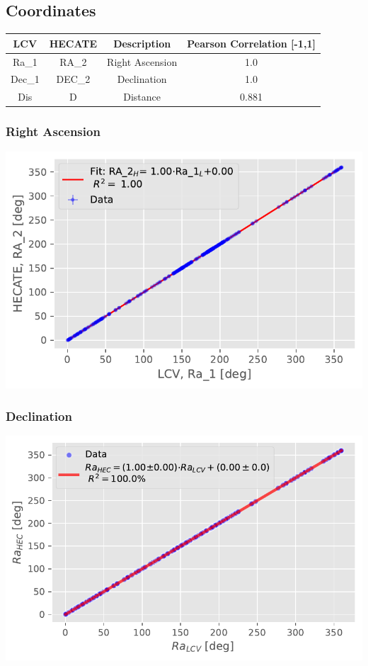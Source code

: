 \documentclass[
]{article}
\begin{document}
\subsection{Coordinates}\label{coordinates}

\begin{longtable}[]{@{}cccc@{}}
\toprule\noalign{}
LCV & HECATE & Description & Pearson Correlation {[}-1,1{]} \\
\midrule\noalign{}
\endhead
\bottomrule\noalign{}
\endlastfoot
Ra\_1 & RA\_2 & Right Ascension & 1.0 \\
Dec\_1 & DEC\_2 & Declination & 1.0 \\
Dis & D & Distance & 0.881 \\
\end{longtable}

\subsubsection{Right Ascension}

\includegraphics{compare_files/figure-pdf/cell-12-output-1.pdf}

\subsubsection{Declination}

\includegraphics{compare_files/figure-pdf/cell-13-output-1.pdf}
\end{document}
